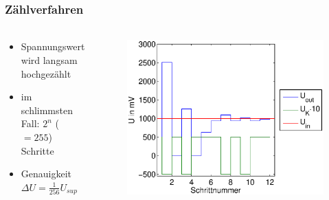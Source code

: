 \begin{frame}
    \frametitle{Zählverfahren}
    \framesubtitle{}
    \begin{columns}[c]
            \begin{block}{}
                \begin{itemize}
                    \item Spannungswert wird langsam hochgezählt
                    \item im schlimmsten Fall: $2^n$ ($=255$) Schritte
                    \item Genauigkeit $\Delta U = \frac{1}{256} U_{sup}$
                \end{itemize}
            \end{block}
            \begin{figure}[H]
            \begin{center}
                    \includegraphics[scale=0.4]{./img/graph/Aufgabe2a2.eps}
            \end{center}
            \end{figure}
    \end{columns}
\end{frame}

